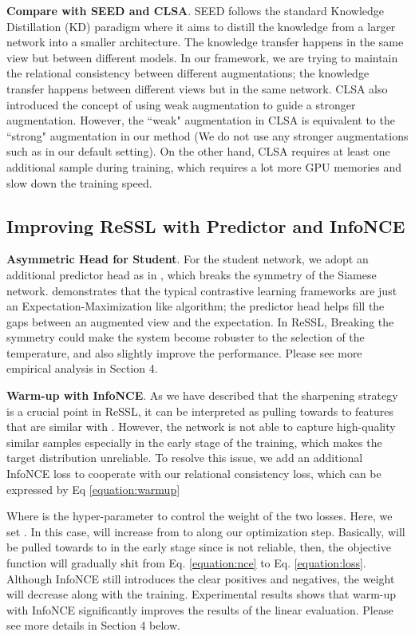 \documentclass{article}
\newcommand{\<}{\left\langle}
\renewcommand{\>}{\right\rangle}
\begin{document}
\textbf{Compare with SEED and CLSA}.  SEED \cite{seed} follows the standard Knowledge Distillation (KD) paradigm \cite{hinton2015distilling,you2017learning,du2020agree} where it aims to distill the knowledge from a larger network into a smaller architecture. The knowledge transfer happens in the same view but between different models. In our framework, we are trying to maintain the relational consistency between different augmentations; the knowledge transfer happens between different views but in the same network. CLSA \cite{stronger} also introduced the concept of using weak augmentation to guide a stronger augmentation. However, the ``weak" augmentation in CLSA is equivalent to the ``strong" augmentation in our method (We do not use any stronger augmentations such as \cite{autoaugment, randaugment} in our default setting). On the other hand, CLSA requires at least one additional sample during training, which requires a lot more GPU memories and slow down the training speed.

\subsection{Improving ReSSL with Predictor and InfoNCE}
\textbf{Asymmetric Head for Student}. For the student network, we adopt an additional predictor head as in \cite{byol,SimSiam}, which breaks the symmetry of the Siamese network. \cite{SimSiam} demonstrates that the typical contrastive learning frameworks are just an Expectation-Maximization like algorithm; the predictor head helps fill the gaps between an augmented view and the expectation. In ReSSL,  Breaking the symmetry could make the system become robuster to the selection of the temperature, and also slightly improve the performance. Please see more empirical analysis in Section 4. 

\textbf{Warm-up with InfoNCE}. As we have described that the sharpening strategy is a crucial point in ReSSL, it can be interpreted as pulling  towards to features that are similar with . However, the network is not able to capture high-quality similar samples especially in the early stage of the training, which makes the target distribution  unreliable. To resolve this issue,
we add an additional InfoNCE loss to cooperate with our relational consistency loss, which can be expressed by Eq \eqref{equation:warmup}

Where  is the hyper-parameter to control the weight of the two losses. Here, we set . In this case,  will increase from  to  along our optimization step. Basically,  will be pulled towards to  in the early stage since  is not reliable, then, the objective function will gradually shit from Eq. \eqref{equation:nce}  to Eq. \eqref{equation:loss}. Although InfoNCE still introduces the clear positives and negatives, the weight will decrease along with the training. Experimental results shows that warm-up with InfoNCE significantly improves the results of the linear evaluation. Please see more details in Section 4 below.
\end{document}
